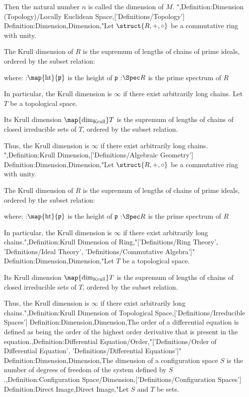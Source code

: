Then the natural number $n$ is called the dimension of $M$.
",Definition:Dimension (Topology)/Locally Euclidean Space,['Definitions/Topology']
Definition:Dimension,Dimension,"Let $\struct {R, +, \circ}$ be a commutative ring with unity.


The Krull dimension of $R$ is the supremum of lengths of chains of prime ideals, ordered by the subset relation:




where:
:$\map {\mathrm {ht} } {\mathfrak p}$ is the height of $\mathfrak p$
:$\Spec R$ is the prime spectrum of $R$



In particular, the Krull dimension is $\infty$ if there exist arbitrarily long chains.
Let $T$ be a topological space.


Its Krull dimension $\map {\dim_{\mathrm {Krull} } } T$ is the supremum of lengths of chains of closed irreducible sets of $T$, ordered by the subset relation.

Thus, the Krull dimension is $\infty$ if there exist arbitrarily long chains.
",Definition:Krull Dimension,['Definitions/Algebraic Geometry']
Definition:Dimension,Dimension,"Let $\struct {R, +, \circ}$ be a commutative ring with unity.


The Krull dimension of $R$ is the supremum of lengths of chains of prime ideals, ordered by the subset relation:




where:
:$\map {\mathrm {ht} } {\mathfrak p}$ is the height of $\mathfrak p$
:$\Spec R$ is the prime spectrum of $R$



In particular, the Krull dimension is $\infty$ if there exist arbitrarily long chains.",Definition:Krull Dimension of Ring,"['Definitions/Ring Theory', 'Definitions/Ideal Theory', 'Definitions/Commutative Algebra']"
Definition:Dimension,Dimension,"Let $T$ be a topological space.


Its Krull dimension $\map {\dim_{\mathrm {Krull} } } T$ is the supremum of lengths of chains of closed irreducible sets of $T$, ordered by the subset relation.

Thus, the Krull dimension is $\infty$ if there exist arbitrarily long chains.",Definition:Krull Dimension of Topological Space,['Definitions/Irreducible Spaces']
Definition:Dimension,Dimension,The order of a differential equation is defined as being the order of the highest order derivative that is present in the equation.,Definition:Differential Equation/Order,"['Definitions/Order of Differential Equation', 'Definitions/Differential Equations']"
Definition:Dimension,Dimension,The dimension of a configuration space $S$ is the number of degrees of freedom of the system defined by $S$.,Definition:Configuration Space/Dimension,['Definitions/Configuration Spaces']
Definition:Direct Image,Direct Image,"Let $S$ and $T$ be sets.

